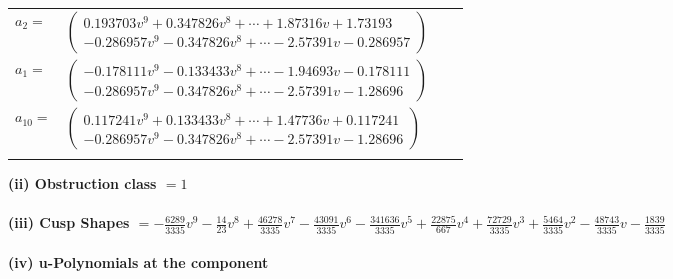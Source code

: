 \documentclass[1p]{elsarticle_modified}
\theoremstyle{definition}
\begin{document}
\begin{tabular}{m{7pt} m{180pt} m{7pt} m{180pt} }
\flushright $a_{2}=$&$\begin{pmatrix}0.193703 v^{9}+0.347826 v^{8}+\cdots+1.87316 v+1.73193\\-0.286957 v^{9}-0.347826 v^{8}+\cdots-2.57391 v-0.286957\end{pmatrix}$ \\
\flushright $a_{1}=$&$\begin{pmatrix}-0.178111 v^{9}-0.133433 v^{8}+\cdots-1.94693 v-0.178111\\-0.286957 v^{9}-0.347826 v^{8}+\cdots-2.57391 v-1.28696\end{pmatrix}$ \\
\flushright $a_{10}=$&$\begin{pmatrix}0.117241 v^{9}+0.133433 v^{8}+\cdots+1.47736 v+0.117241\\-0.286957 v^{9}-0.347826 v^{8}+\cdots-2.57391 v-1.28696\end{pmatrix}$\\&\end{tabular}
\flushleft \textbf{(ii) Obstruction class $= 1$}\\~\\
\flushleft \textbf{(iii) Cusp Shapes $= -\frac{6289}{3335} v^9-\frac{14}{23} v^8+\frac{46278}{3335} v^7-\frac{43091}{3335} v^6-\frac{341636}{3335} v^5+\frac{22875}{667} v^4+\frac{72729}{3335} v^3+\frac{5464}{3335} v^2-\frac{48743}{3335} v-\frac{1839}{3335}$}\\~\\
\newpage\renewcommand{\arraystretch}{1}
\flushleft \textbf{(iv) u-Polynomials at the component}\newline \\
\end{document}
